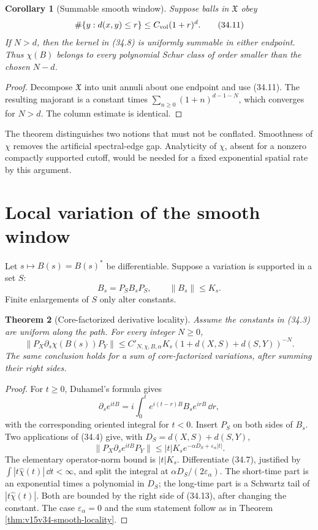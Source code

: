 \documentclass[11pt]{article}
\newtheorem{theorem}{Theorem}[section]
\newtheorem{corollary}[theorem]{Corollary}
\theoremstyle{remark}
\begin{document}
\begin{corollary}[Summable smooth window]
\label{cor:v15v34-summable}
Suppose balls in \(\mathfrak X\) obey
\[
 \#\{y:d(x,y)\leq r\}\leq C_{\rm vol}(1+r)^d.              \tag{34.11}
\]
If \(N>d\), then the kernel in (34.8) is uniformly summable in
either endpoint.  Thus \(\chi(B)\) belongs to every polynomial
Schur class of order smaller than the chosen \(N-d\).
\end{corollary}

\begin{proof}
Decompose \(\mathfrak X\) into unit annuli about one endpoint and
use (34.11).  The resulting majorant is a constant times
\(\sum_{n\geq0}(1+n)^{d-1-N}\), which converges for \(N>d\).
The column estimate is identical.
\end{proof}

The theorem distinguishes two notions that must not be conflated.
Smoothness of \(\chi\) removes the artificial spectral-edge gap.
Analyticity of \(\chi\), absent for a nonzero compactly supported
cutoff, would be needed for a fixed exponential spatial rate by this
argument.

\section{Local variation of the smooth window}

Let \(s\mapsto B(s)=B(s)^*\) be differentiable.  Suppose a
variation is supported in a set \(S\):
\[
 B_s=P_SB_sP_S,
 \qquad \|B_s\|\leq K_s.                                  \tag{34.12}
\]
Finite enlargements of \(S\) only alter constants.

\begin{theorem}[Core-factorized derivative locality]
\label{thm:v15v34-derivative}
Assume the constants in (34.3) are uniform along the path.  For
every integer \(N\geq0\),
\[
 \boxed{
 \|P_X\partial_s\chi(B(s))P_Y\|
 \leq C'_{N,\chi,B,\alpha}K_s
 (1+d(X,S)+d(S,Y))^{-N}.}                                  \tag{34.13}
\]
The same conclusion holds for a sum of core-factorized variations,
after summing their right sides.
\end{theorem}

\begin{proof}
For \(t\geq0\), Duhamel's formula gives
\[
 \partial_s e^{itB}
 =i\int_0^t e^{i(t-r)B}B_se^{irB}\,\dd r,                 \tag{34.14}
\]
with the corresponding oriented integral for \(t<0\).  Insert
\(P_S\) on both sides of \(B_s\).  Two applications of (34.4)
give, with
\(D_S=d(X,S)+d(S,Y)\),
\[
 \|P_X\partial_s e^{itB}P_Y\|
 \leq |t|K_s e^{-\alpha D_S+\varepsilon_\alpha|t|}.        \tag{34.15}
\]
The elementary operator-norm bound is \(|t|K_s\).  Differentiate
(34.7), justified by
\(\int |t\widehat\chi(t)|\,\dd t<\infty\), and split the
integral at
\(\alpha D_S/(2\varepsilon_\alpha)\).  The short-time part is an
exponential times a polynomial in \(D_S\); the long-time part is a
Schwartz tail of \(|t\widehat\chi(t)|\).  Both are bounded by the
right side of (34.13), after changing the constant.  The case
\(\varepsilon_\alpha=0\) and the sum statement follow as in
Theorem \ref{thm:v15v34-smooth-locality}.
\end{proof}
\end{document}
